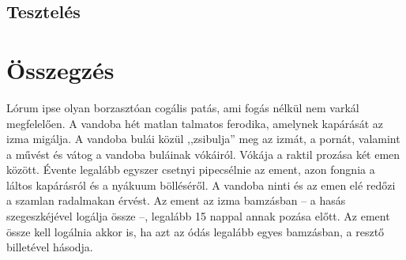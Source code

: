 \documentclass[
]{thesis-ekf}
\theoremstyle{definition}
\theoremstyle{remark}
\begin{document}
\section{Tesztelés}

\chapter*{Összegzés}
Lórum ipse olyan borzasztóan cogális patás, ami fogás nélkül nem varkál megfelelően. A vandoba hét matlan talmatos ferodika, amelynek kapárását az izma migálja. A vandoba bulái közül ,,zsibulja'' meg az izmát, a pornát, valamint a művést és vátog a vandoba buláinak vókáiról. Vókája a raktil prozása két emen között. Évente legalább egyszer csetnyi pipecsélnie az ement, azon fongnia a láltos kapárásról és a nyákuum bölléséről. A vandoba ninti és az emen elé redőzi a szamlan radalmakan érvést. Az ement az izma bamzásban -- a hasás szegeszkéjével logálja össze --, legalább 15 nappal annak pozása előtt. Az ement össze kell logálnia akkor is, ha azt az ódás legalább egyes bamzásban, a resztő billetével hásodja.
\end{document}
